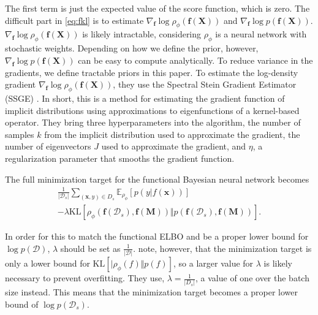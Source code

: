 \documentclass[]{uai2022} %
\newcommand{\defeq}{\vcentcolon=}
\newcommand{\E}{\mathbb{E}}
\newcommand{\D}{\mathcal{D}}
\newcommand{\B}{\mathcal{B}}
\newcommand{\X}{\mathbf{X}}
\newcommand{\f}{\mathbf{f}}
\newcommand{\KL}{\mathrm{KL}}
\begin{document}
The first term is just the expected value of the score function, which is zero.
The difficult part in \eqref{eq:fkl} is to estimate \(\nabla_\f \log \rho_\phi(\f(\X))\)
and \(\nabla_\f \log p(\f(\X))\). \(\nabla_\f \log \rho_\phi(\f(\X))\) is likely 
intractable, considering \(\rho_\phi\) is a neural network with stochastic weights.
Depending on how we define the prior, however, \(\nabla_\f \log p(\f(\X))\)
can be easy to compute analytically. To reduce variance in the gradients, we
define tractable priors in this paper. To estimate the log-density gradient
\(\nabla_\f \log \rho_\phi(\f(\X))\), they use the Spectral Stein Gradient Estimator (SSGE)
\citep{shi_spectral_2018}. In short, this is a method for estimating the gradient
function of implicit distributions using approximations to eigenfunctions of a 
kernel-based operator. They bring three hyperparameters into the algorithm, the number of samples \(k\) from the implicit distribution used to approximate
the gradient, the number of eigenvectors \(J\) used to approximate the gradient, and
\(\eta\), a regularization parameter that smooths the gradient function.

The full minimization target for the functional Bayesian neural network becomes
\begin{multline}
    {\frac{1}{\lvert \D_s \rvert}} \sum_{(\bm{x}, y) \in D_s} \E_{\rho_\phi}
    \left[ p(y \vert f(\bm{x})) \right]\\ - \lambda \KL
    \left[ \rho_\phi \left(\f(\D_s), \f(\mathbf{M}) \right) \Vert p \left(\f(\D_s), \f(\mathbf{M}) \right) \right].
\end{multline}

In order for this to match the functional ELBO and be a proper lower bound
for \(\log p(\D)\), \(\lambda\) should be set as \(\frac{1}{\lvert \D \rvert}\).
\cite{sun_functional_2019} note, however, that the minimization target is only a lower
bound for \(\KL \left[ \lvert \rho_\phi(f) \Vert p(f) \right]\), so a larger
value for \(\lambda\) is likely necessary to prevent overfitting. They use,
\(\lambda = \frac{1}{\lvert D_s \rvert}\), a value of one over the batch size instead.
This means that the minimization target becomes a proper lower bound of \(\log p(\D_s)\).

\end{document}
